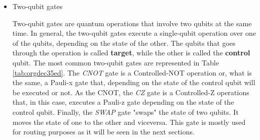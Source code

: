 \begin{itemize}
\begin{itemize}
The \emph{Identity} gate is the idling operation.
It is equivalent to no applying any operation for a cycle.
The \emph{Pauli-x, -y and -z} gates are 180° rotation over the x-, y- and z-axis respectively.
Eg. a qubit with state \(|+\rangle\) that is equivalent to the position \(\theta = \frac{\pi}{2}, \phi = 0\) in the Bloch sphere is rotated in the y-axis with a Pauli-y gate, \(Y|+\rangle = \frac{i}{\sqrt{2}} \begin{bmatrix}-1 \\ 1 \end{bmatrix}\).
This resulting state is located in \(\theta = \frac{\pi}{2}, \phi = \pi\), that is a 180° rotation in the Y axis.
The \emph{Hadamard} gate is also a 180° rotation, but over the diagonal axis between the x- and z-axes, \(\frac{({\hat {x}}+{\hat {z}})}{\sqrt {2}}}\).
The \emph{S} and \emph{T} gates are also rotations over the z-axis but of 90° and 45° respectively.


\item Two-qubit gates
\label{sec:orge53b97f}

Two-qubit gates are quantum operations that involve two qubits at the same time.
In general, the two-qubit gates execute a single-qubit operation over one of the qubits, depending on the state of the other.
The qubits that goes through the operation is called \textbf{target}, while the other is called the \textbf{control} qubit.
The most common two-qubit gates are represented in Table \ref{tab:orgdec35ed}.
The \emph{CNOT} gate is a Controlled-NOT operation or, what is the same, a Pauli-x gate that, depending on the state of the control qubit will be executed or not.
As the CNOT, the \emph{CZ} gate is a Controlled-Z operations that, in this case, executes a Pauli-z gate depending on the state of the control qubit.
Finally, the \emph{SWAP} gate "swaps" the state of two qubits.
It moves the state of one to the other and viceversa.
This gate is mostly used for routing purposes as it will be seen in the next sections.


\end{itemize}
\end{itemize}
